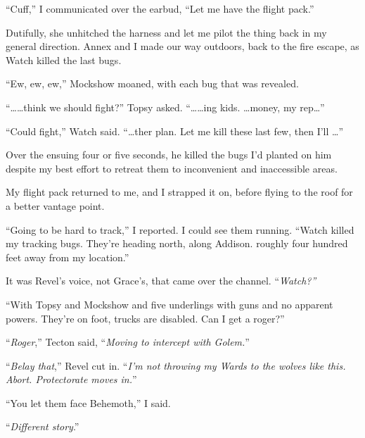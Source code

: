 ``Cuff,'' I communicated over the earbud, ``Let me have the flight pack.''



Dutifully, she unhitched the harness and let me pilot the thing back in my general direction.  Annex and I made our way outdoors, back to the fire escape, as Watch killed the last bugs.



``Ew, ew, ew,'' Mockshow moaned, with each bug that was revealed.



``\ldots \ldots think we should fight?'' Topsy asked.  ``\ldots \ldots{}ing kids.  \ldots money, my rep\ldots''



``Could fight,'' Watch said.  ``\ldots{}ther plan.  Let me kill these last few, then I'll \ldots''



Over the ensuing four or five seconds, he killed the bugs I'd planted on him despite my best effort to retreat them to inconvenient and inaccessible areas.



My flight pack returned to me, and I strapped it on, before flying to the roof for a better vantage point.



``Going to be hard to track,'' I reported.  I could see them running.  ``Watch killed my tracking bugs.  They're heading north, along Addison. roughly four hundred feet away from my location.''



It was Revel's voice, not Grace's, that came over the channel.  ``\emph{Watch?''}



``With Topsy and Mockshow and five underlings with guns and no apparent powers.  They're on foot, trucks are disabled.  Can I get a roger?''



``\emph{Roger},'' Tecton said, ``\emph{Moving to intercept with Golem.}''



``\emph{Belay that},'' Revel cut in.  ``\emph{I'm not throwing my Wards to the wolves like this.  Abort.  Protectorate moves in.}''



``You let them face Behemoth,'' I said.



``\emph{Different story}.''



